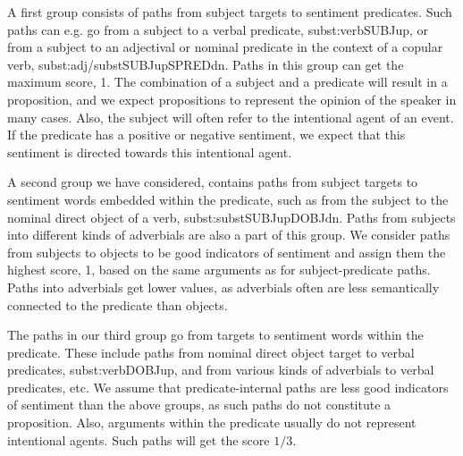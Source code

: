 \documentclass[11pt]{article}
\begin{document}
A first group consists of paths from subject targets to sentiment predicates. Such paths can e.g. go from a subject to a verbal predicate, subst:verb{\textunderscore}{\textunderscore}SUBJ{\textunderscore}up, or from a subject to an adjectival or nominal predicate in the context of a copular verb, subst:adj/subst{\textunderscore}{\textunderscore}SUBJ{\textunderscore}up{\textunderscore}{\textunderscore}SPRED{\textunderscore}dn. Paths in this group can get the maximum score, 1. The combination of a subject and a predicate will result in a proposition, and we expect propositions to represent the opinion of the speaker in many cases. Also, the subject will often refer to the intentional agent of an event. If the predicate has a positive or negative sentiment, we expect that this sentiment is directed towards this intentional agent. 

A second group we have considered, contains paths from subject targets to sentiment words embedded within the predicate, such as from the subject to the nominal direct object of a verb, subst:subst{\textunderscore}{\textunderscore}SUBJ{\textunderscore}up{\textunderscore}{\textunderscore}DOBJ{\textunderscore}dn. Paths from subjects into different kinds of adverbials are also a part of this group. We consider paths from subjects to objects to be good indicators of sentiment and assign them the highest score, 1, based on the same arguments as for subject-predicate paths. Paths into adverbials get lower values, as adverbials often are less semantically connected to the predicate than objects.

The paths in our third group go from targets to sentiment words within the predicate. These include paths from nominal direct object target to verbal predicates, subst:verb{\textunderscore}{\textunderscore}DOBJ{\textunderscore}up, and from various kinds of adverbials to verbal predicates, etc. We assume that predicate-internal paths are less good indicators of sentiment than the above groups, as such paths do not constitute a proposition. Also, arguments within the predicate usually do not represent intentional agents. Such paths will get the score $1/3$.
\end{document}
